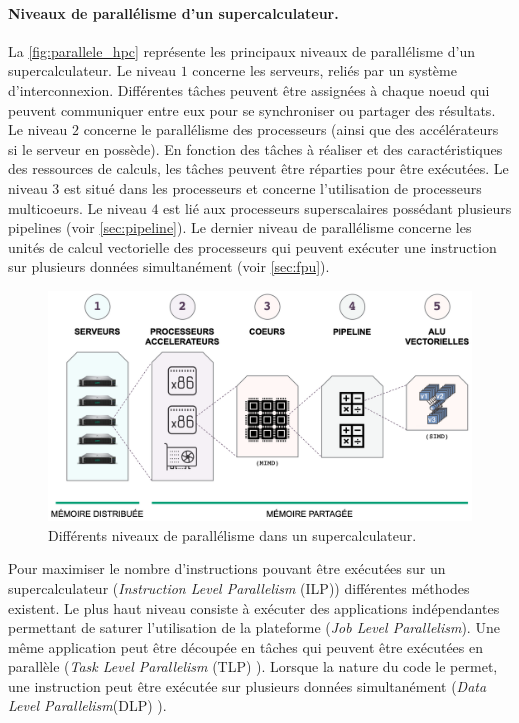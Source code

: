         \paragraph{Niveaux de parallélisme d'un supercalculateur.}
            La \autoref{fig:parallele_hpc} représente les principaux niveaux de parallélisme d'un supercalculateur. Le  niveau $1$ concerne les serveurs, reliés par un système d'interconnexion. Différentes tâches peuvent être assignées à chaque noeud qui peuvent communiquer entre eux pour se synchroniser ou partager des résultats. Le niveau $2$ concerne le parallélisme des processeurs (ainsi que des accélérateurs si le serveur en possède). En fonction des tâches à réaliser et des caractéristiques des ressources de calculs, les tâches peuvent être réparties pour être exécutées. Le niveau $3$ est situé dans les processeurs et concerne l'utilisation de processeurs multicoeurs. Le niveau $4$ est lié aux processeurs superscalaires possédant plusieurs pipelines (voir \autoref{sec:pipeline}). Le dernier niveau de parallélisme concerne les unités de calcul vectorielle des processeurs qui peuvent exécuter une instruction sur plusieurs données simultanément (voir \autoref{sec:fpu}).
            
            \begin{figure}
                \center
                \includegraphics[width=14cm]{images/parallele_hpc.png}
                \caption{\label{fig:parallele_hpc} Différents niveaux de parallélisme dans un supercalculateur.}
            \end{figure}
            
            Pour maximiser le nombre d'instructions pouvant être exécutées sur un supercalculateur (\textit{Instruction Level Parallelism} (ILP)) différentes méthodes existent. Le plus haut niveau consiste à exécuter des applications indépendantes permettant de saturer l'utilisation de la plateforme (\textit{Job Level Parallelism}). Une même application peut être découpée en tâches qui peuvent être exécutées en parallèle (\textit{Task Level Parallelism} (TLP) \cite{Kambadur2009}). Lorsque la nature du code le permet, une instruction peut être exécutée sur plusieurs données simultanément (\textit{Data Level Parallelism}(DLP) \cite{Espasa1997}).

